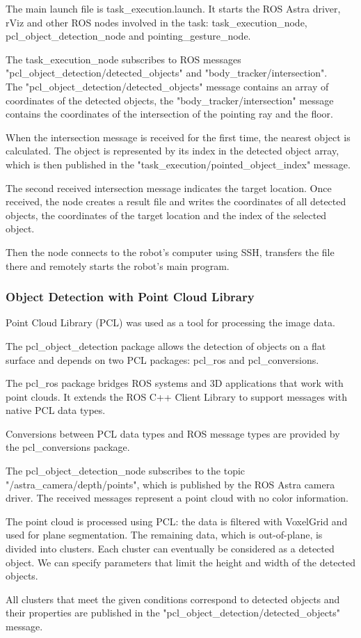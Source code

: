 The main launch file is task\_execution.launch. It starts the ROS Astra driver, rViz and other ROS nodes involved in the task: task\_execution\_node, pcl\_object\_detection\_node and pointing\_gesture\_node.\par
The task\_execution\_node subscribes to ROS messages\\
"pcl\_object\_detection/detected\_objects" and "body\_tracker/intersection".\\
The "pcl\_object\_detection/detected\_objects" message contains an array of coordinates of the detected objects, the "body\_tracker/intersection" message contains the coordinates of the intersection of the pointing ray and the floor.\par
When the intersection message is received for the first time, the nearest object is calculated. The object is represented by its index in the detected object array, which is then published in the "task\_execution/pointed\_object\_index" message.\par
The second received intersection message indicates the target location.
Once received, the node creates a result file and writes the coordinates of all detected objects, the coordinates of the target location and the index of the selected object.\par
Then the node connects to the robot's computer using SSH, transfers the file there and remotely starts the robot's main program.\par

\subsubsection{Object Detection with Point Cloud Library}
Point Cloud Library (PCL) was used as a tool for processing the image data.\par
The pcl\_object\_detection package allows the detection of objects on a flat surface and depends on two PCL packages: pcl\_ros and pcl\_conversions.\par
The pcl\_ros package bridges ROS systems and 3D applications that work with point clouds. It extends the ROS C++ Client Library to support messages with native PCL data types.\par
Conversions between PCL data types and ROS message types are provided by the pcl\_conversions package.\par
The pcl\_object\_detection\_node subscribes to the topic \\"/astra\_camera/depth/points", which is published by the ROS Astra camera driver. The received messages represent a point cloud with no color information.\par
The point cloud is processed using PCL: the data is filtered with VoxelGrid and used for plane segmentation. The remaining data, which is out-of-plane, is divided into clusters.
Each cluster can eventually be considered as a detected object. We can specify parameters that limit the height and width of the detected objects.\par
All clusters that meet the given conditions correspond to detected objects and their properties are published in the "pcl\_object\_detection/detected\_objects" message.\par

